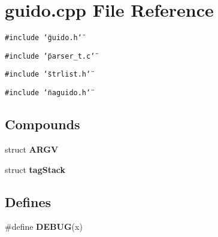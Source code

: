 \section{guido.cpp File Reference}
\label{guido_8cpp}
{\tt \#include \char`\"{}guido.h\char`\"{}}\par
{\tt \#include \char`\"{}parser\_\-t.c\char`\"{}}\par
{\tt \#include \char`\"{}strlist.h\char`\"{}}\par
{\tt \#include \char`\"{}naguido.h\char`\"{}}\par
\subsection*{Compounds}
\begin{CompactItemize}
\item 
struct {\bf ARGV}
\item 
struct {\bf tag\-Stack}
\end{CompactItemize}
\subsection*{Defines}
\begin{CompactItemize}
\item 
\#define {\bf DEBUG}(x)
\end{CompactItemize}
